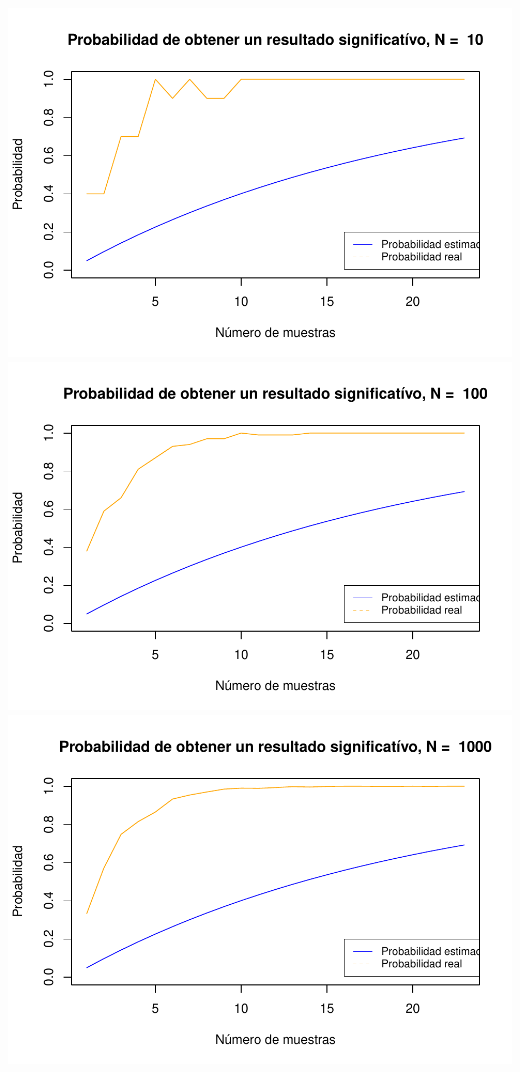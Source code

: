\documentclass[]{article}
\begin{document}
\includegraphics{Enunciado_Tarea_3_files/figure-latex/unnamed-chunk-12-1.pdf}
\includegraphics{Enunciado_Tarea_3_files/figure-latex/unnamed-chunk-12-2.pdf}
\includegraphics{Enunciado_Tarea_3_files/figure-latex/unnamed-chunk-12-3.pdf}
\end{document}
